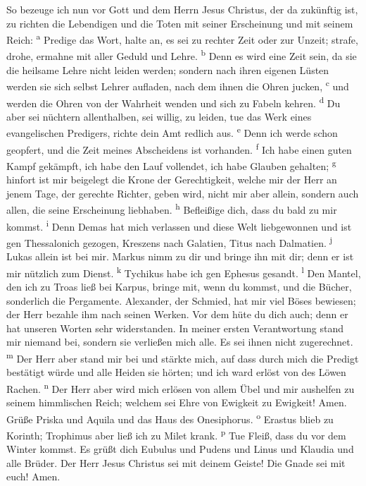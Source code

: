  So bezeuge ich nun vor Gott und dem Herrn Jesus Christus,
der da zukünftig ist, zu richten die Lebendigen und die Toten mit seiner
Erscheinung und mit seinem Reich: \textsuperscript{a} 
Predige das Wort, halte an, es sei zu rechter Zeit oder zur Unzeit;
strafe, drohe, ermahne mit aller Geduld und Lehre. \textsuperscript{b}
 Denn es wird eine Zeit sein, da sie die heilsame Lehre
nicht leiden werden; sondern nach ihren eigenen Lüsten werden sie sich
selbst Lehrer aufladen, nach dem ihnen die Ohren jucken,
\textsuperscript{c}  und werden die Ohren von der Wahrheit
wenden und sich zu Fabeln kehren. \textsuperscript{d}  Du
aber sei nüchtern allenthalben, sei willig, zu leiden, tue das Werk
eines evangelischen Predigers, richte dein Amt redlich aus.
\textsuperscript{e}  Denn ich werde schon geopfert, und
die Zeit meines Abscheidens ist vorhanden. \textsuperscript{f}
 Ich habe einen guten Kampf gekämpft, ich habe den Lauf
vollendet, ich habe Glauben gehalten; \textsuperscript{g} 
hinfort ist mir beigelegt die Krone der Gerechtigkeit, welche mir der
Herr an jenem Tage, der gerechte Richter, geben wird, nicht mir aber
allein, sondern auch allen, die seine Erscheinung liebhaben.
\textsuperscript{h}  Befleißige dich, dass du bald zu mir
kommst. \textsuperscript{i}  Denn Demas hat mich
verlassen und diese Welt liebgewonnen und ist gen Thessalonich gezogen,
Kreszens nach Galatien, Titus nach Dalmatien. \textsuperscript{j}
 Lukas allein ist bei mir. Markus nimm zu dir und bringe
ihn mit dir; denn er ist mir nützlich zum Dienst. \textsuperscript{k}
 Tychikus habe ich gen Ephesus gesandt.
\textsuperscript{l}  Den Mantel, den ich zu Troas ließ
bei Karpus, bringe mit, wenn du kommst, und die Bücher, sonderlich die
Pergamente.  Alexander, der Schmied, hat mir viel Böses
bewiesen; der Herr bezahle ihm nach seinen Werken.  Vor
dem hüte du dich auch; denn er hat unseren Worten sehr widerstanden.
 In meiner ersten Verantwortung stand mir niemand bei,
sondern sie verließen mich alle. Es sei ihnen nicht zugerechnet.
\textsuperscript{m}  Der Herr aber stand mir bei und
stärkte mich, auf dass durch mich die Predigt bestätigt würde und alle
Heiden sie hörten; und ich ward erlöst von des Löwen Rachen.
\textsuperscript{n}  Der Herr aber wird mich erlösen von
allem Übel und mir aushelfen zu seinem himmlischen Reich; welchem sei
Ehre von Ewigkeit zu Ewigkeit! Amen.  Grüße Priska und
Aquila und das Haus des Onesiphorus. \textsuperscript{o} 
Erastus blieb zu Korinth; Trophimus aber ließ ich zu Milet krank.
\textsuperscript{p}  Tue Fleiß, dass du vor dem Winter
kommst. Es grüßt dich Eubulus und Pudens und Linus und Klaudia und alle
Brüder.  Der Herr Jesus Christus sei mit deinem Geiste!
Die Gnade sei mit euch! Amen.
